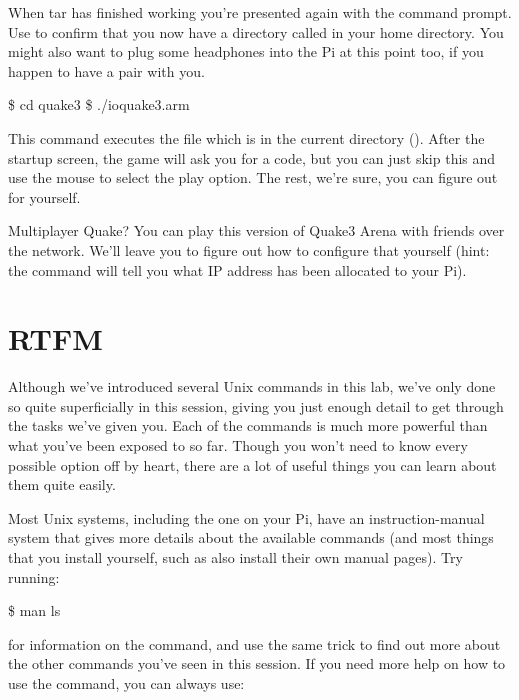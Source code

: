 \noindent When tar has finished working you're presented again with the command prompt. Use  to confirm that you now have a directory called  in your home directory.  You might also want to plug some headphones into the Pi at this point too, if you happen to have a pair with you.

\begin{ttoutenv}
\$ cd quake3
\$ ./ioquake3.arm
\end{ttoutenv}

This command executes the file  which is in the current directory (). After the startup screen, the game will ask you for a code, but you can just skip this and use the mouse to select the play option. The rest, we're sure, you can figure out for yourself.

\begin{diversion}{Multiplayer Quake?}
You can play this version of Quake3 Arena with friends over the network. We'll leave you to figure out how to configure that yourself (hint: the  command will tell you what IP address has been allocated to your Pi).
\end{diversion}

\FloatBarrier
\section{RTFM}

Although we've introduced several Unix commands in this lab, we've only done so quite superficially in this session, giving you just enough detail to get through the tasks we've given you. Each of the commands is much more powerful than what you've been exposed to so far. Though you won't need to know every possible option off by heart, there are a lot of useful things you can learn about them quite easily.

Most Unix systems, including the one on your Pi, have an instruction-manual system that gives more details about the available commands (and most things that you install yourself, such as  also install their own manual pages).  Try running:

\begin{ttoutenv}
\$ man ls
\end{ttoutenv}

\noindent for information on the  command, and use the same trick to find out more about the other commands you've seen in this session. If you need more help on how to use the  command, you can always use:

